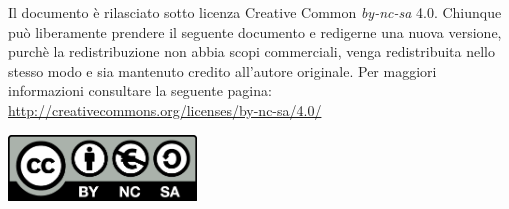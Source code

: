 Il documento è rilasciato sotto licenza Creative Common \textit{by-nc-sa} 4.0. Chiunque può liberamente prendere il seguente documento e redigerne una nuova versione, purchè la redistribuzione non abbia scopi commerciali, venga redistribuita nello stesso modo e sia mantenuto credito all'autore originale. Per maggiori informazioni consultare la seguente pagina: \url{http://creativecommons.org/licenses/by-nc-sa/4.0/}

\begin{center}

\includegraphics[width=50mm]{images/cc.png}

\end{center}